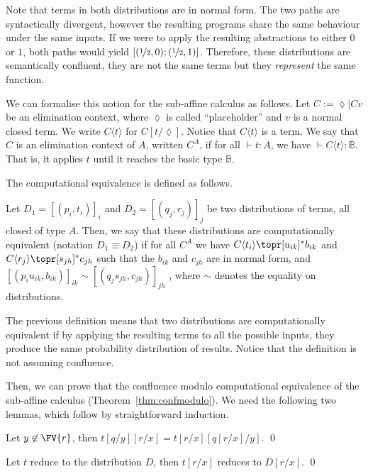 Note that terms in both distributions are in normal form. The two paths are syntactically divergent, however the resulting programs share the same behaviour under the same inputs. If we were to apply the resulting abstractions to either $0$ or $1$, both paths would yield $[(\nicefrac 12, 0); (\nicefrac 12, 1)]$. Therefore, these distributions are semantically confluent, they are not the same terms but they \textit{represent} the same function.

We can formalise this notion for the sub-affine calculus as follows. Let 
\(
  C := \lozenge\mid Cv
\)
be an elimination context, where $\lozenge$ is called ``placeholder'' and $v$ is a normal closed term. We write $C\langle t\rangle$ for $C[t/\lozenge]$. Notice that $C\langle t\rangle$ is a term. We say that $C$ is an elimination context of $A$, written $C^A$, if for all $\vdash t:A$, we have $\vdash C\langle t\rangle:\mathbb B$. That is, it applies $t$ until it reaches the basic type $\mathbb B$.

The computational equivalence is defined as follows.
\begin{defin}
Let $D_1 = [(p_i,t_i)]_i$ and $D_2 = [(q_j,r_j)]_j$ be two distributions of
terms, all closed of type $A$. Then, we say that these distributions are
computationally equivalent (notation $D_1\equiv D_2$) if for all $C^A$ we have
$C\langle t_i\rangle\topr[u_{ik}]^* b_{ik}$ and $C\langle r_j\rangle\topr[s_{jh}]^* c_{jh}$ such that the
$b_{ik}$ and $c_{jh}$ are in normal form, and  $[(p_iu_{ik},b_{ik})]_{ik} \sim
[(q_js_{jh},c_{jh})]_{jh}$
, where $\sim$ denotes the equality on distributions.
\end{defin}
The previous definition means that two distributions are computationally equivalent if by applying the resulting terms to all the possible inputs, they produce the same probability distribution of results. Notice that the definition is not assuming confluence. 

Then, we can prove that the confluence modulo computational equivalence of the sub-affine calculus (Theorem~\ref{thm:confmodulo}). We need the following two lemmas, which follow by straightforward induction.
\begin{lem}\label{lem:subst}
Let $y\not\in\FV{r}$, then $t[q/y][r/x]= t[r/x][q[r/x]/y]$.
\qed
\end{lem}

\begin{lem}\label{lem:distRed}
Let $t$ reduce to the distribution $D$, then $t[r/x]$ reduces to $D[r/x]$.
\qed
\end{lem}

